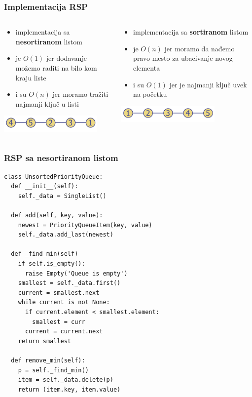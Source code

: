 \documentclass[compress]{beamer}
\begin{document}
\begin{frame}[fragile]
\frametitle{Implementacija RSP}
\begin{columns}
  \begin{column}[c]{5.5cm}
    \begin{itemize}
      \item implementacija sa \textbf{nesortiranom} listom
      \item {} je $O(1)$ jer dodavanje možemo raditi na bilo kom kraju liste
      \item {} i  su $O(n)$ jer moramo tražiti najmanji ključ u listi
    \end{itemize}
    \begin{center}
      \includegraphics[width=5cm]{asp-09-pic01a.png}
    \end{center}
  \end{column}
  \begin{column}[c]{5.5cm}
    \begin{itemize}
      \item implementacija sa \textbf{sortiranom} listom
      \item {} je $O(n)$ jer moramo da nađemo pravo mesto za ubacivanje novog elementa
      \item {} i  su $O(1)$ jer je najmanji ključ uvek na početku
    \end{itemize}
    \begin{center}
      \includegraphics[width=5cm]{asp-09-pic01b.png}
    \end{center}
  \end{column}
\end{columns}
\end{frame}

\begin{frame}
  \frametitle{RSP sa nesortiranom listom}
\begin{verbatim}
class UnsortedPriorityQueue:
  def __init__(self):
    self._data = SingleList()
    
  def add(self, key, value):
    newest = PriorityQueueItem(key, value) 
    self._data.add_last(newest)
    
  def _find_min(self)
    if self.is_empty():
      raise Empty('Queue is empty')
    smallest = self._data.first()
    current = smallest.next
    while current is not None:
      if current.element < smallest.element:
        smallest = curr
      current = current.next
    return smallest
  
  def remove_min(self):
    p = self._find_min()
    item = self._data.delete(p)
    return (item.key, item.value)
\end{verbatim}
\end{frame}
\end{document}
